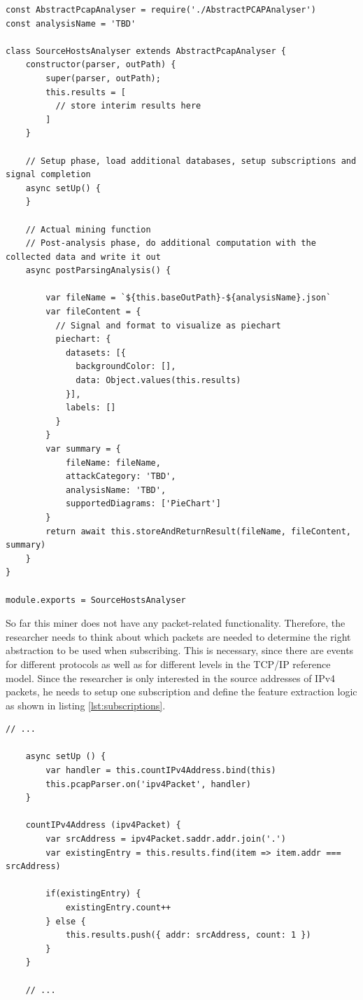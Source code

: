 \begin{lstlisting}[caption={Initial content of the newly create Miner},label={lst:initialtemplate}]
const AbstractPcapAnalyser = require('./AbstractPCAPAnalyser')
const analysisName = 'TBD'

class SourceHostsAnalyser extends AbstractPcapAnalyser {
    constructor(parser, outPath) {
        super(parser, outPath);
        this.results = [
          // store interim results here
        ]
    }

    // Setup phase, load additional databases, setup subscriptions and signal completion
    async setUp() {
    }

    // Actual mining function
    // Post-analysis phase, do additional computation with the collected data and write it out
    async postParsingAnalysis() {

        var fileName = `${this.baseOutPath}-${analysisName}.json`
        var fileContent = {
          // Signal and format to visualize as piechart
          piechart: {
            datasets: [{
              backgroundColor: [],
              data: Object.values(this.results)
            }],
            labels: []
          }
        }
        var summary = {
            fileName: fileName,
            attackCategory: 'TBD',
            analysisName: 'TBD',
            supportedDiagrams: ['PieChart']
        }
        return await this.storeAndReturnResult(fileName, fileContent, summary)
    }
}

module.exports = SourceHostsAnalyser

\end{lstlisting}

So far this miner does not have any packet-related functionality. Therefore, the researcher needs to think about which packets are needed to determine the right abstraction to be used when subscribing. This is necessary, since there are events for different protocols as well as for different levels in the TCP/IP reference model. Since the researcher is only interested in the source addresses of IPv4 packets, he needs to setup one subscription and define the feature extraction logic as shown in listing \ref{lst:subscriptions}.

\begin{lstlisting}[caption={Creating a subscription and mining source addresses},label={lst:subscriptions}]
    // ...
    
    async setUp () {
        var handler = this.countIPv4Address.bind(this)
        this.pcapParser.on('ipv4Packet', handler)
    }

    countIPv4Address (ipv4Packet) {
        var srcAddress = ipv4Packet.saddr.addr.join('.')
        var existingEntry = this.results.find(item => item.addr === srcAddress)

        if(existingEntry) {
            existingEntry.count++
        } else {
            this.results.push({ addr: srcAddress, count: 1 })
        }
    }
    
    // ...
 

\end{lstlisting}

